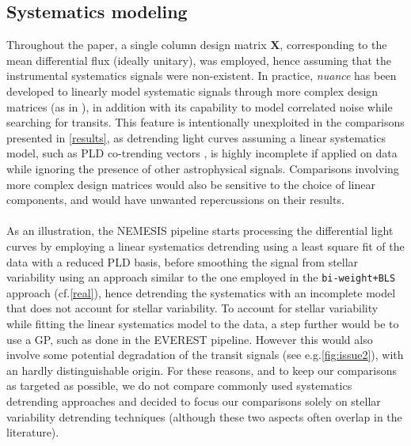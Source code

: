 \documentclass[modern]{aastex631}
\newcommand{\nuancemethod}{\textit{nuance}}
\begin{document}
\subsection{Systematics modeling}\label{systematics}
Throughout the paper, a single column design matrix $\bm{X}$, corresponding to the mean differential flux (ideally unitary), was employed, hence assuming that the instrumental systematics signals were non-existent. In practice, \nuancemethod{} has been developed to linearly model systematic signals through more complex design matrices (as in \citealt{foreman2016}), in addition with its capability to model correlated noise while searching for transits. This feature is intentionally unexploited in the comparisons presented in \autoref{results}, as detrending light curves assuming a linear systematics model, such as PLD co-trending vectors \citep{pld}, is highly incomplete if applied on data while ignoring the presence of other astrophysical signals. Comparisons involving more complex design matrices would also be sensitive to the choice of linear components, and would have unwanted repercussions on their results.\\\\
As an illustration, the NEMESIS pipeline \citep{nemesis} starts processing the differential light curves by employing a linear systematics detrending using a least square fit of the data with a reduced PLD basis, before smoothing the signal from stellar variability using an approach similar to the one employed in the \texttt{bi-weight+BLS} approach (cf.\;\autoref{real}), hence detrending the systematics with an incomplete model that does not account for stellar variability. To account for stellar variability while fitting the linear systematics model to the data, a step further would be to use a GP, such as done in the EVEREST \citep{everest2} pipeline. However this would also involve some potential degradation of the transit signals (see e.g.\;\autoref{fig:issue2}), with an hardly distinguishable origin. For these reasons, and to keep our comparisons as targeted as possible, we do not compare commonly used systematics detrending approaches and decided to focus our comparisons solely on stellar variability detrending techniques (although these two aspects often overlap in the literature).\\\\
\end{document}
